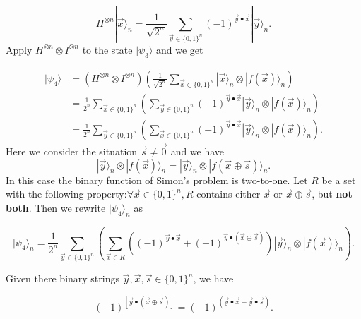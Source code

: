 $$
H^{\otimes n}|\vec{x}\rangle_n = \frac{1}{\sqrt{2^n}} \sum_{\vec{y} \in\{0,1\}^n}(-1)^{\vec{y} \bullet \vec{x}}|\vec{y}\rangle_n.
$$ 
Apply $H^{\otimes n} \otimes I^{\otimes n}$ to the state $|\psi_3\rangle$ and we get 

$$
\begin{aligned}
|\psi_4\rangle 
& =\left(H^{\otimes n} \otimes I^{\otimes n}\right) \left(\frac{1}{\sqrt{2^n}} \sum_{\vec{x} \in\{0,1\}^n}|\vec{x}\rangle_n \otimes |f(\vec{x})\rangle_n\right) \\
& =\frac{1}{2^n} \sum_{\vec{x} \in \{0, 1\}^n}\left(\sum_{\vec{y} \in \{0, 1\}^n}(-1)^{\vec{y} \bullet \vec{x}}|\vec{y}\rangle_n \otimes|f(\vec{x})\rangle_n\right)\\
& =\frac{1}{2^n} \sum_{\vec{y} \in \{0, 1\}^n}\left(\sum_{\vec{x} \in \{0, 1\}^n}(-1)^{\vec{y} \bullet \vec{x}}|\vec{y}\rangle_n \otimes|f(\vec{x})\rangle_n\right).
\end{aligned}
$$
Here we consider the situation $\vec{s} \neq \vec{0}$ and we have
$$
|\vec{y}\rangle_n \otimes|f(\vec{x})\rangle_n=|\vec{y}\rangle_n \otimes|f(\vec{x} \oplus \vec{s})\rangle_n.
$$
In this case the binary function of Simon's problem is two-to-one. Let $R$ be a set with the following property:$\forall \vec{x} \in\{0,1\}^n, R$ contains either $\vec{x}$ or $\vec{x} \oplus \vec{s}$, but \textbf{not both}. Then we rewrite $|\psi_4\rangle_n$ as

$$
|\psi_4\rangle_n = \frac{1}{2^{n}} \sum_{\vec{y} \in \{0,1\}^n}\left(\sum_{\vec{x} \in R} \left((-1)^{\vec{y} \bullet \vec{x}} +(-1)^{\vec{y} \bullet(\vec{x} \oplus \vec{s})}\right)|\vec{y}\rangle_n \otimes |f(\vec{x})\rangle_n\right).
$$
\begin{remark}\label{binary string 1}
Given there binary strings $\vec{y}, \vec{x}, \vec{s} \in \{0, 1\}^n$, we have

$$
(-1)^{[\vec{y} \bullet (\vec{x} \oplus \vec{s})]} 
= (-1)^{(\vec{y} \bullet \vec{x}+\vec{y} \bullet \vec{s})}.
$$
\end{remark}

